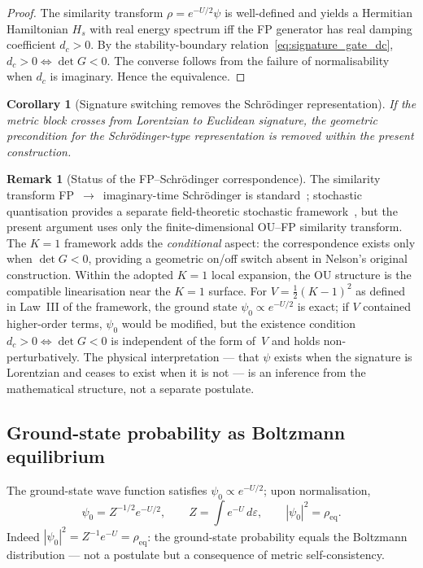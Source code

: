 \documentclass[11pt,a4paper]{article}
\newtheorem{corollary}[theorem]{Corollary}
\theoremstyle{definition}
\newtheorem{remark}{Remark}
\begin{document}
\begin{proof}
The similarity transform $\rho = e^{-U/2}\psi$ is well-defined and yields a Hermitian Hamiltonian $H_s$ with real energy spectrum iff the FP generator has real damping coefficient $d_c > 0$. By the stability-boundary relation~\eqref{eq:signature_gate_dc}, $d_c>0\iff\det G<0$. The converse follows from the failure of normalisability when $d_c$ is imaginary. Hence the equivalence.
\end{proof}

\begin{corollary}[Signature switching removes the Schr\"odinger representation]\label{cor:switch}
If the metric block crosses from Lorentzian to Euclidean signature, the geometric precondition for the Schr\"odinger-type representation is removed within the present construction.
\end{corollary}

\begin{remark}[Status of the FP--Schr\"odinger correspondence]
The similarity transform FP~$\to$~imaginary-time Schr\"odinger is standard~\cite{Nelson,Risken}; stochastic quantisation provides a separate field-theoretic stochastic framework~\cite{ParisiWu}, but the present argument uses only the finite-dimensional OU--FP similarity transform. The $K{=}1$ framework adds the \emph{conditional} aspect: the correspondence exists only when $\det G < 0$, providing a geometric on/off switch absent in Nelson's original construction. Within the adopted $K{=}1$ local expansion, the OU structure is the compatible linearisation near the $K{=}1$ surface. For $V = \tfrac{1}{2}(K-1)^2$ as defined in Law~III of the framework, the ground state $\psi_0 \propto e^{-U/2}$ is exact; if $V$ contained higher-order terms, $\psi_0$ would be modified, but the existence condition $d_c > 0 \Leftrightarrow \det G < 0$ is independent of the form of~$V$ and holds non-perturbatively. The physical interpretation --- that $\psi$ exists when the signature is Lorentzian and ceases to exist when it is not --- is an inference from the mathematical structure, not a separate postulate.
\end{remark}

\subsection{Ground-state probability as Boltzmann equilibrium}

The ground-state wave function satisfies $\psi_0 \propto e^{-U/2}$; upon normalisation,
\begin{equation}
\psi_0 = Z^{-1/2} e^{-U/2},
\qquad
Z = \int e^{-U}\,d\varepsilon,
\qquad
|\psi_0|^2=\rho_{\mathrm{eq}}.
\label{eq:ground_state_identity}
\end{equation}
Indeed $|\psi_0|^2 = Z^{-1}e^{-U} = \rho_{\mathrm{eq}}$: the ground-state probability equals the Boltzmann distribution --- not a postulate but a consequence of metric self-consistency.
\end{document}
